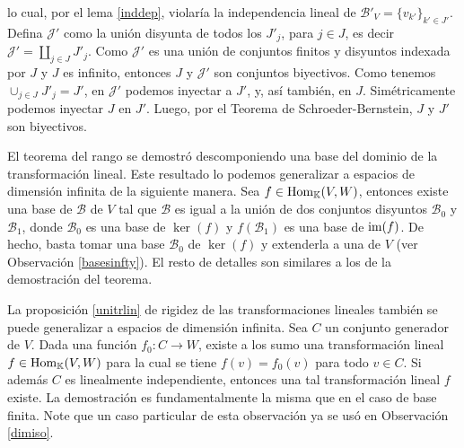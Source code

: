 \begin{obs}
lo cual, por el lema \ref{inddep}, violar\'ia la independencia lineal de $\mathcal{B}'_V=\{v_{k'}\}_{k'\in J'}$. Defina $\mathcal{J}'$ como la uni\'on disyunta de todos los $J'_j$, para $j\in J$, es decir $\mathcal{J}'=\coprod_{j\in J} J'_j$.
Como $\mathcal{J}'$ es una uni\'on de conjuntos finitos y disyuntos indexada por $J$ y $J$ es infinito, entonces $J$ y $\mathcal{J}'$ son conjuntos biyectivos. Como tenemos $\cup_{j\in J}J'_j=J'$, en $\mathcal{J}'$ podemos inyectar a $J'$, y, as\'i tambi\'en, en $J$. Sim\'etricamente podemos inyectar $J$ en $J'$. Luego, por el Teorema de Schroeder-Bernstein, $J$ y $J'$ son biyectivos.
\end{obs}

\begin{obs}
El teorema del rango se demostr\'o descomponiendo una base del dominio de la transformaci\'on lineal. Este resultado lo podemos generalizar a espacios de dimensi\'on infinita de la siguiente manera. Sea $f\in\operatorname{Hom}_{\mathbb{K}}(V,W)$, entonces existe una base de $\mathcal{B}$ de $V$ tal que $\mathcal{B}$ es igual a la unión de dos conjuntos disyuntos $\mathcal{B}_0$ y $ \mathcal{B}_1$, donde $\mathcal{B}_0$ es una base de $\ker(f)$ y $f\left(\mathcal{B}_1\right)$ es una base de $\operatorname{im}(f)$. De hecho, basta tomar una base $\mathcal{B}_0$ de $\ker(f)$ y extenderla a una de $V$ (ver Observaci\'on \ref{basesinfty}). El resto de detalles son similares a los de la demostraci\'on del teorema.
\end{obs}

\begin{obs}\label{unitrlinealinfty}
La proposici\'on \ref{unitrlin} de rigidez de las transformaciones lineales tambi\'en se puede generalizar a espacios de dimensi\'on infinita. Sea $C$ un conjunto generador de $V$. Dada una funci\'on $f_0: C\rightarrow W$, existe a los sumo una transformaci\'on lineal $f\in\operatorname{Hom}_{\mathbb{K}}(V,W)$ para la cual se tiene $f(v)=f_0(v)$ para todo $v\in C$. Si adem\'as $C$ es linealmente independiente, entonces una tal transformaci\'on lineal $f$ existe. La demostraci\'on es fundamentalmente la misma que en el caso de base finita. Note que un caso particular de esta observaci\'on ya se us\'o en Observaci\'on \ref{dimiso}.
\end{obs}

